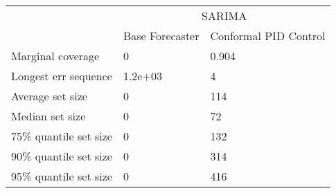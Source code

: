 \begin{tabular}{lll}
\toprule
& \multicolumn{2}{c}{SARIMA} \\
& Base Forecaster & Conformal PID Control \\
\midrule
Marginal coverage & 0 & 0.904 \\
Longest err sequence & 1.2e+03 & 4 \\
Average set size & 0 & 114 \\
Median set size & 0 & 72 \\
75\% quantile set size & 0 & 132 \\
90\% quantile set size & 0 & 314 \\
95\% quantile set size & 0 & 416 \\
\bottomrule
\end{tabular}
